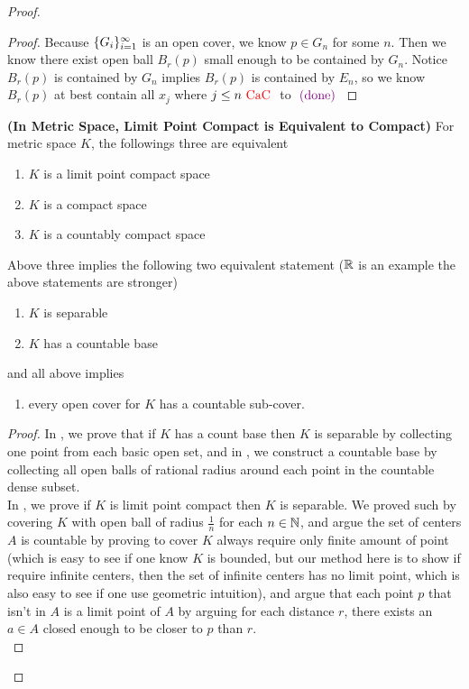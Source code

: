 \documentclass{report}
\begin{document}
\begin{proof}
\begin{proof}
Because $\{ G_i \}_{i=1}^\infty$ is an open cover, we know $p\in G_n$ for some $n$. Then we know there exist open ball $B_r(p)$ small enough to be contained by $G_n$. Notice  $B_r(p)$ is contained by $G_n$ implies $B_r(p)$ is contained by $E_n$, so we know  $B_r(p)$ at best contain all $x_j$ where  $j\leq n\text{ \textcolor{red}{CaC} }$ to  $\textcolor{violet}{\text{ (done) }}$
\end{proof}
\begin{theorem}
\label{1.10.5}
\textbf{(In Metric Space, Limit Point Compact is Equivalent to Compact)} For metric space $K$, the followings three are equivalent
\begin{enumerate}[label=(\alph*)]
  \item $K$ is a limit point compact space
  \item $K$ is a compact space
  \item $K$ is a countably compact space
\end{enumerate}
Above three implies the following two equivalent statement ($\mathbb{R}$ is an example the above statements are stronger)
\begin{enumerate}[label=(\arabic*)]
  \item $K$ is separable
  \item $K$ has a countable base
\end{enumerate}
and all above implies
\begin{enumerate}[label=(\roman*)]
  \item every open cover for $K$ has a countable sub-cover.
\end{enumerate}
\end{theorem}
\begin{proof}
In , we prove that if $K$ has a count base then $K$ is separable by collecting one point from each basic open set, and in , we construct a countable base by collecting all open balls of rational radius around each point in the countable dense subset.\\

In , we prove if $K$ is limit point compact then  $K$ is separable. We proved such by covering $K$ with open ball of radius $\frac{1}{n}$ for each $n\in\mathbb{N}$, and argue the set of centers $A$ is countable by proving to cover $K$ always require only finite amount of point (which is easy to see if one know $K$ is bounded, but our method here is to show if require infinite centers, then the set of infinite centers has no limit point, which is also easy to see if one use geometric intuition), and argue that each point $p$ that isn't in $A$ is a limit point of $A$ by arguing for each distance $r$, there exists an  $a\in A$ closed enough to be closer to $p$ than $r$.\\


\end{proof}
\end{proof}
\end{document}
